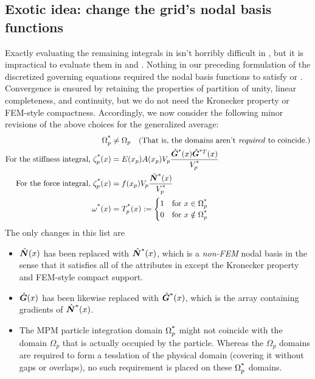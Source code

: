 \subsection{Exotic idea: change the grid's nodal basis functions}
Exactly evaluating the remaining integrals in  isn't horribly difficult in \oneD, but it is impractical to evaluate them in \twoD and \threeD.  Nothing in our preceding formulation of the discretized governing equations required the nodal basis functions to satisfy  or . Convergence is ensured by retaining the properties of partition of unity,  linear completeness, and continuity, but we do not need the Kronecker property or FEM-style compactness. Accordingly, we now consider the following minor revisions of the above choices for the generalized average:
\begin{subequations}
\begin{align}
  \Omega_p^{\text{*}} &\ne \Omega_p\quad\text{(That is, the domains aren't \emph{required} to coincide.)}
\\
 \text{For the stiffness integral, }  \zeta_p^{\text{*}}(x)&=E(x_p)A(x_p)V_p \frac{\hat{\bm{G}}^{\text{*}}(x)\hat{\bm{G}}^{\text{*} T}(x)}{V_p^{\text{*}}}
\\
 \text{For the force integral, }  \zeta_p^{\text{*}}(x)&=f(x_p)V_p \frac{\hat{\bm{N}}^{\text{*}}(x)}{V_p^{\text{*}}}
\\
  \omega^{\text{*}}(x) &=T_p^{\text{*}}(x):=\begin{cases}1 & \text{for }x\in\Omega_p^{\text{*}} \\
                                0 & \text{for }x\notin\Omega_p^{\text{*}}
                   \end{cases}
\end{align}
\label{eq:CPDIChoices}
\end{subequations}
The only changes in this list are
\begin{itemize}
  \item $\hat{\bm{N}}(x)$ has been replaced with $\hat{\bm{N}}^{\text{*}}(x)$, which is a \emph{non-FEM} nodal basis in the sense that it satisfies all of the attributes in  except the Kronecker property and FEM-style compact support.
  \item $\hat{\bm{G}}(x)$ has been likewise replaced with $\hat{\bm{G}}^{\text{*}}(x)$, which is the array containing gradients of $\hat{\bm{N}}^{\text{*}}(x)$.
  \item The MPM particle integration domain  $\Omega_p^{\text{*}}$ might not coincide with the domain $\Omega_p$ that is actually occupied by the particle. Whereas the $\Omega_p$ domains are required to form a tesslation of the physical domain (covering it without gaps or overlaps), no such requirement is placed on these $\Omega_p^{\text{*}}$ domains.
\end{itemize} 

